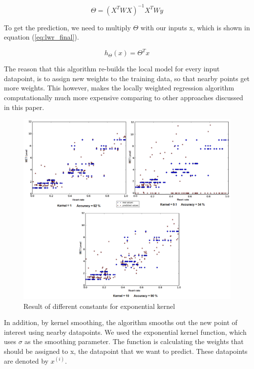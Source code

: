 \documentclass[12pt, a4paper, onecolumn, oneside, parskip=half]{scrartcl}
\begin{document}
\begin{equation}
\label{eq:lwr_wght_theta}
 \Theta = (X^TWX)^{-1}X^TWy
\end{equation}

To get the prediction, we need to multiply $\Theta$ with our inputs x, which is shown in equation (\ref{eq:lwr_final}).


\begin{equation}
\label{eq:lwr_final}
 h_\Theta(x) = \Theta^Tx
\end{equation}


The reason that this algorithm re-builds the local model for every input datapoint, is to assign new weights to the training data, so that nearby points get more weights. This however, makes the locally weighted regression algorithm computationally much more expensive comparing to other approaches discussed in this paper.

\begin{figure}[ht!]
  \centering
  \includegraphics[width=160mm]{pictures/lwr_3_kernel_constants5.png}
  \caption{Result of different constants for exponential kernel
  \label{lwr_3_kernel}}
\end{figure}

In addition, by kernel smoothing, the algorithm smooths out the new point of interest using nearby datapoints. We used the exponential kernel function, which uses $\sigma$ as the smoothing parameter. The function is calculating the weights that should be assigned to x, the datapoint that we want to predict. These datapoints are denoted by $x^{(i)}$. 
\end{document}
